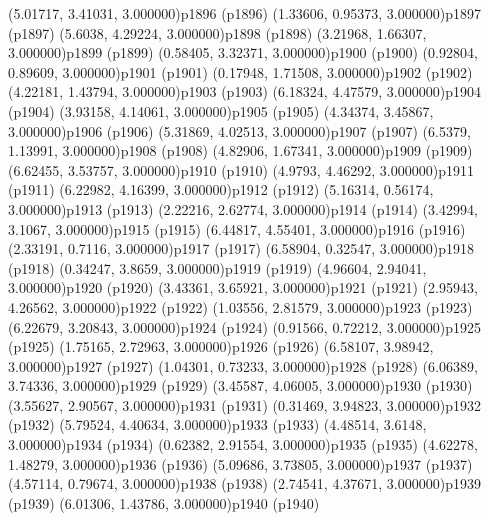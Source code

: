 \psPoint(5.01717, 3.41031, 3.000000){p1896}
\psdot(p1896)
\psPoint(1.33606, 0.95373, 3.000000){p1897}
\psdot(p1897)
\psPoint(5.6038, 4.29224, 3.000000){p1898}
\psdot(p1898)
\psPoint(3.21968, 1.66307, 3.000000){p1899}
\psdot(p1899)
\psPoint(0.58405, 3.32371, 3.000000){p1900}
\psdot(p1900)
\psPoint(0.92804, 0.89609, 3.000000){p1901}
\psdot(p1901)
\psPoint(0.17948, 1.71508, 3.000000){p1902}
\psdot(p1902)
\psPoint(4.22181, 1.43794, 3.000000){p1903}
\psdot(p1903)
\psPoint(6.18324, 4.47579, 3.000000){p1904}
\psdot(p1904)
\psPoint(3.93158, 4.14061, 3.000000){p1905}
\psdot(p1905)
\psPoint(4.34374, 3.45867, 3.000000){p1906}
\psdot(p1906)
\psPoint(5.31869, 4.02513, 3.000000){p1907}
\psdot(p1907)
\psPoint(6.5379, 1.13991, 3.000000){p1908}
\psdot(p1908)
\psPoint(4.82906, 1.67341, 3.000000){p1909}
\psdot(p1909)
\psPoint(6.62455, 3.53757, 3.000000){p1910}
\psdot(p1910)
\psPoint(4.9793, 4.46292, 3.000000){p1911}
\psdot(p1911)
\psPoint(6.22982, 4.16399, 3.000000){p1912}
\psdot(p1912)
\psPoint(5.16314, 0.56174, 3.000000){p1913}
\psdot(p1913)
\psPoint(2.22216, 2.62774, 3.000000){p1914}
\psdot(p1914)
\psPoint(3.42994, 3.1067, 3.000000){p1915}
\psdot(p1915)
\psPoint(6.44817, 4.55401, 3.000000){p1916}
\psdot(p1916)
\psPoint(2.33191, 0.7116, 3.000000){p1917}
\psdot(p1917)
\psPoint(6.58904, 0.32547, 3.000000){p1918}
\psdot(p1918)
\psPoint(0.34247, 3.8659, 3.000000){p1919}
\psdot(p1919)
\psPoint(4.96604, 2.94041, 3.000000){p1920}
\psdot(p1920)
\psPoint(3.43361, 3.65921, 3.000000){p1921}
\psdot(p1921)
\psPoint(2.95943, 4.26562, 3.000000){p1922}
\psdot(p1922)
\psPoint(1.03556, 2.81579, 3.000000){p1923}
\psdot(p1923)
\psPoint(6.22679, 3.20843, 3.000000){p1924}
\psdot(p1924)
\psPoint(0.91566, 0.72212, 3.000000){p1925}
\psdot(p1925)
\psPoint(1.75165, 2.72963, 3.000000){p1926}
\psdot(p1926)
\psPoint(6.58107, 3.98942, 3.000000){p1927}
\psdot(p1927)
\psPoint(1.04301, 0.73233, 3.000000){p1928}
\psdot(p1928)
\psPoint(6.06389, 3.74336, 3.000000){p1929}
\psdot(p1929)
\psPoint(3.45587, 4.06005, 3.000000){p1930}
\psdot(p1930)
\psPoint(3.55627, 2.90567, 3.000000){p1931}
\psdot(p1931)
\psPoint(0.31469, 3.94823, 3.000000){p1932}
\psdot(p1932)
\psPoint(5.79524, 4.40634, 3.000000){p1933}
\psdot(p1933)
\psPoint(4.48514, 3.6148, 3.000000){p1934}
\psdot(p1934)
\psPoint(0.62382, 2.91554, 3.000000){p1935}
\psdot(p1935)
\psPoint(4.62278, 1.48279, 3.000000){p1936}
\psdot(p1936)
\psPoint(5.09686, 3.73805, 3.000000){p1937}
\psdot(p1937)
\psPoint(4.57114, 0.79674, 3.000000){p1938}
\psdot(p1938)
\psPoint(2.74541, 4.37671, 3.000000){p1939}
\psdot(p1939)
\psPoint(6.01306, 1.43786, 3.000000){p1940}
\psdot(p1940)
